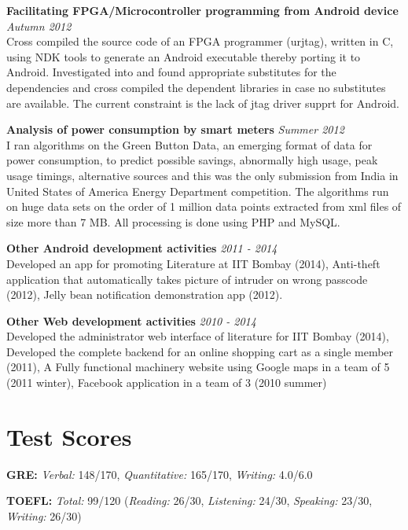 \documentclass[margin,line]{resume}
\begin{document}
\begin{resume}
    {\bf Facilitating FPGA/Microcontroller programming from Android device} \hfill \textit{Autumn 2012} \\
     Cross compiled the source code of an FPGA programmer (urjtag), written in C, using NDK tools to generate an Android executable thereby porting it to Android. Investigated into and found appropriate substitutes for the dependencies and cross compiled the dependent libraries in case no substitutes are available. The current constraint is the lack of jtag driver supprt for Android.
    	
    {\bf Analysis of power consumption by smart meters} \hfill \textit{Summer 2012} \\
     I ran algorithms on the Green Button Data, an emerging format of data for power consumption, to predict possible savings, abnormally high usage, peak usage timings, alternative sources and this was the only submission from India in United States of America Energy Department competition. The algorithms run on huge data sets on the order of 1 million data points extracted from xml files of size more than 7 MB. All processing is done using PHP and MySQL.
    	
    {\bf Other Android development activities} \hfill \textit{2011 - 2014} \\
    Developed an app for promoting Literature at IIT Bombay (2014), Anti-theft application that automatically takes picture of intruder on wrong passcode (2012), Jelly bean notification demonstration app (2012).
    	
    {\bf Other Web development activities} \hfill \textit{2010 - 2014} \\
    Developed the administrator web interface of literature for IIT Bombay (2014), Developed the complete backend for an online shopping cart as a single member (2011), A Fully functional machinery website using Google maps in a team of 5 (2011 winter), Facebook application in a team of 3 (2010 summer)
    
    

\section{\mysidestyle Test Scores}
\begin{list1}  
\item \textbf{GRE:} \textit{Verbal:} 148/170, \textit{Quantitative:} 165/170, \textit{Writing:} 4.0/6.0
\item \textbf{TOEFL:} \textit{Total:} 99/120 (\textit{Reading:} 26/30, \textit{Listening:} 24/30, \textit{Speaking:} 23/30, \textit{Writing:} 26/30)
\end{list1}


\end{resume}
\end{document}
